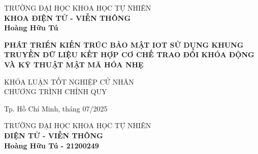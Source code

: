 \begin{titlepage}
\thispagestyle{empty}
\begin{center}
TRƯỜNG ĐẠI HỌC KHOA HỌC TỰ NHIÊN\\
\textbf{KHOA ĐIỆN TỬ - VIỄN THÔNG}\\[2cm]


{ \Large \bfseries Hoàng Hữu Tú\\[2cm] } 


{ \Large \bfseries PHÁT TRIỂN KIẾN TRÚC BẢO MẬT IOT SỬ DỤNG KHUNG TRUYỀN DỮ LIỆU KẾT HỢP CƠ CHẾ TRAO ĐỔI KHÓA ĐỘNG VÀ KỸ THUẬT MẬT MÃ HÓA NHẸ\\[3cm]} 


\large KHÓA LUẬN TỐT NGHIỆP CỬ NHÂN\\
\large CHƯƠNG TRÌNH CHÍNH QUY\\



\vfill
Tp. Hồ Chí Minh, tháng 07/2025

\end{center}

\pagebreak


\thispagestyle{empty}
\begin{center}

TRƯỜNG ĐẠI HỌC KHOA HỌC TỰ NHIÊN\\
\textbf{ĐIỆN TỬ - VIỄN THÔNG}\\[2cm]


{\large \bfseries Hoàng Hữu Tú - 21200249\\[2cm]} 



\end{center}
\end{titlepage}
